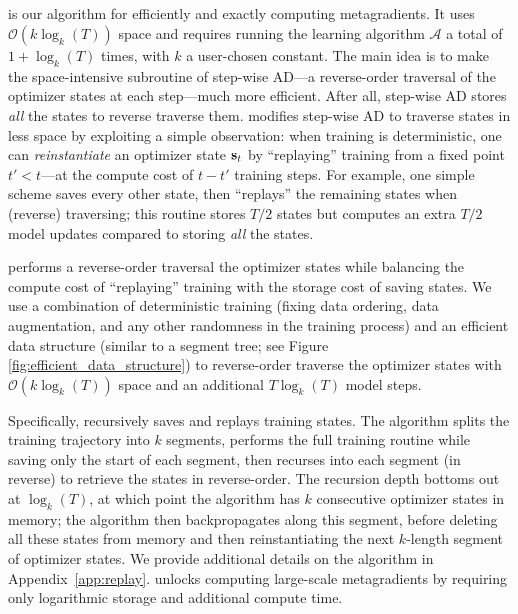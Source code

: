 \subsection{\replay{}} 
\replay{} is our algorithm for efficiently and exactly computing metagradients.
It uses $\mathcal{O}(k\log_k(T))$ space and requires running the learning algorithm $\mathcal{A}$
a total of $1 + \log_k(T)$ times, 
with $k$ a user-chosen constant. The main idea is to make the space-intensive subroutine of
step-wise AD---a reverse-order traversal of the optimizer states at each
step---much more efficient. After all, step-wise AD stores \textit{all} the
states to reverse traverse them. \replay{} modifies step-wise AD to traverse
states in less space by exploiting a simple observation: when training is
deterministic, one can \textit{reinstantiate} an optimizer state $\mathbf{s}_{t}$ by
``replaying'' training from a fixed point $t' < t$---at the compute cost of $t -
t'$ training steps. For example, one simple scheme saves every other state, then
``replays'' the remaining states when (reverse) traversing; this routine
stores $T/2$ states but computes an extra $T/2$ model updates compared
to storing \textit{all} the states.

\replay{} performs a reverse-order traversal the optimizer states while
balancing  the compute cost of ``replaying'' training with the storage cost of
saving states. We use a combination of deterministic training 
(fixing data ordering, data augmentation, and any other randomness in 
the training process) and an efficient data structure (similar to a segment
tree; see Figure \ref{fig:efficient_data_structure}) 
to reverse-order traverse the optimizer states with
$\mathcal{O}(k\log_k(T))$ space and an additional $T\log_k(T)$
model steps. 

Specifically, \replay{} recursively saves and replays training states. The
algorithm splits the training trajectory into $k$ segments, performs the full
training routine while saving only the start of each segment, then recurses
into each segment (in reverse) to retrieve the states in reverse-order. The
recursion depth bottoms out at $\log_k(T)$, at which point the algorithm has
$k$ consecutive optimizer states in memory; the algorithm then backpropagates
along this segment, before deleting all these states from memory and then
reinstantiating the next $k$-length segment of optimizer states. 
We provide additional details on the algorithm in Appendix~\ref{app:replay}.
\replay{} unlocks computing large-scale metagradients by requiring only
logarithmic storage and additional compute time. 




